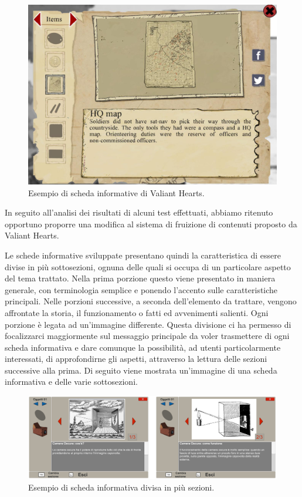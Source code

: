 \begin{figure}%
	\centering
	\includegraphics[width= 0.8\columnwidth]{images/gameDesign/52_valiant.jpg}
	\caption{Esempio di scheda informative di Valiant Hearts.}
	\label{fig:scheda_valiant}
\end{figure}

In seguito all’analisi dei risultati di alcuni test effettuati, abbiamo ritenuto opportuno proporre una modifica al sistema di fruizione di contenuti proposto da Valiant Hearts.

Le schede informative sviluppate presentano quindi la caratteristica di essere divise in più sottosezioni, ognuna delle quali si occupa di un particolare aspetto del tema trattato. Nella prima porzione questo viene presentato in maniera generale, con terminologia semplice e ponendo l’accento sulle caratteristiche principali. Nelle porzioni successive, a seconda dell’elemento da trattare, vengono affrontate la storia, il funzionamento o fatti ed avvenimenti salienti. Ogni porzione è legata ad un’immagine differente. 
Questa divisione ci ha permesso di focalizzarci maggiormente sul messaggio principale da voler trasmettere di ogni scheda informativa e dare comunque la possibilità, ad utenti particolarmente interessati, di approfondirne gli aspetti, attraverso la lettura delle sezioni successive alla prima.
Di seguito viene mostrata un’immagine di una scheda informativa e delle varie sottosezioni.

\begin{figure}%
	\centering
	\includegraphics[width= \columnwidth]{images/gameDesign/52_schede.jpg}
	\caption{Esempio di scheda informativa divisa in più sezioni.}
	\label{fig:scheda_divisa}
\end{figure}

